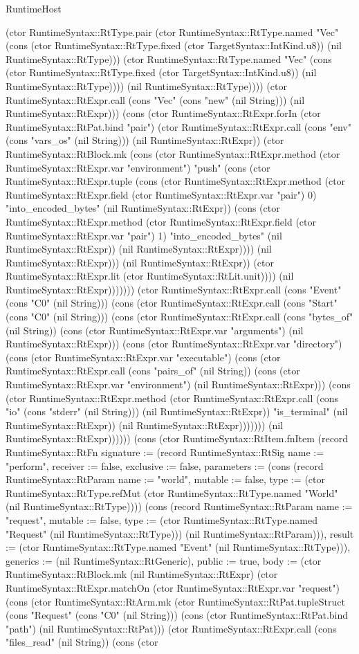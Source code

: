 \begin{lexlean}{RuntimeHost}
\begin{semanticmodule}
{(ctor RuntimeSyntax::RtType.pair (ctor RuntimeSyntax::RtType.named "Vec" (cons (ctor RuntimeSyntax::RtType.fixed (ctor TargetSyntax::IntKind.u8)) (nil RuntimeSyntax::RtType))) (ctor RuntimeSyntax::RtType.named "Vec" (cons (ctor RuntimeSyntax::RtType.fixed (ctor TargetSyntax::IntKind.u8)) (nil RuntimeSyntax::RtType)))) (nil RuntimeSyntax::RtType)))) (ctor RuntimeSyntax::RtExpr.call (cons "Vec" (cons "new" (nil String))) (nil RuntimeSyntax::RtExpr))) (cons (ctor RuntimeSyntax::RtExpr.forIn (ctor RuntimeSyntax::RtPat.bind "pair") (ctor RuntimeSyntax::RtExpr.call (cons "env" (cons "vars_os" (nil String))) (nil RuntimeSyntax::RtExpr)) (ctor RuntimeSyntax::RtBlock.mk (cons (ctor RuntimeSyntax::RtExpr.method (ctor RuntimeSyntax::RtExpr.var "environment") "push" (cons (ctor RuntimeSyntax::RtExpr.tuple (cons (ctor RuntimeSyntax::RtExpr.method (ctor RuntimeSyntax::RtExpr.field (ctor RuntimeSyntax::RtExpr.var "pair") 0) "into_encoded_bytes" (nil RuntimeSyntax::RtExpr)) (cons (ctor RuntimeSyntax::RtExpr.method (ctor RuntimeSyntax::RtExpr.field (ctor RuntimeSyntax::RtExpr.var "pair") 1) "into_encoded_bytes" (nil RuntimeSyntax::RtExpr)) (nil RuntimeSyntax::RtExpr)))) (nil RuntimeSyntax::RtExpr))) (nil RuntimeSyntax::RtExpr)) (ctor RuntimeSyntax::RtExpr.lit (ctor RuntimeSyntax::RtLit.unit)))) (nil RuntimeSyntax::RtExpr))))))) (ctor RuntimeSyntax::RtExpr.call (cons "Event" (cons "C0" (nil String))) (cons (ctor RuntimeSyntax::RtExpr.call (cons "Start" (cons "C0" (nil String))) (cons (ctor RuntimeSyntax::RtExpr.call (cons "bytes_of" (nil String)) (cons (ctor RuntimeSyntax::RtExpr.var "arguments") (nil RuntimeSyntax::RtExpr))) (cons (ctor RuntimeSyntax::RtExpr.var "directory") (cons (ctor RuntimeSyntax::RtExpr.var "executable") (cons (ctor RuntimeSyntax::RtExpr.call (cons "pairs_of" (nil String)) (cons (ctor RuntimeSyntax::RtExpr.var "environment") (nil RuntimeSyntax::RtExpr))) (cons (ctor RuntimeSyntax::RtExpr.method (ctor RuntimeSyntax::RtExpr.call (cons "io" (cons "stderr" (nil String))) (nil RuntimeSyntax::RtExpr)) "is_terminal" (nil RuntimeSyntax::RtExpr)) (nil RuntimeSyntax::RtExpr))))))) (nil RuntimeSyntax::RtExpr))))})) (cons (ctor RuntimeSyntax::RtItem.fnItem (record RuntimeSyntax::RtFn {signature := (record RuntimeSyntax::RtSig {name := "perform", receiver := false, exclusive := false, parameters := (cons (record RuntimeSyntax::RtParam {name := "world", mutable := false, type := (ctor RuntimeSyntax::RtType.refMut (ctor RuntimeSyntax::RtType.named "World" (nil RuntimeSyntax::RtType)))}) (cons (record RuntimeSyntax::RtParam {name := "request", mutable := false, type := (ctor RuntimeSyntax::RtType.named "Request" (nil RuntimeSyntax::RtType))}) (nil RuntimeSyntax::RtParam))), result := (ctor RuntimeSyntax::RtType.named "Event" (nil RuntimeSyntax::RtType))}), generics := (nil RuntimeSyntax::RtGeneric), public := true, body := (ctor RuntimeSyntax::RtBlock.mk (nil RuntimeSyntax::RtExpr) (ctor RuntimeSyntax::RtExpr.matchOn (ctor RuntimeSyntax::RtExpr.var "request") (cons (ctor RuntimeSyntax::RtArm.mk (ctor RuntimeSyntax::RtPat.tupleStruct (cons "Request" (cons "C0" (nil String))) (cons (ctor RuntimeSyntax::RtPat.bind "path") (nil RuntimeSyntax::RtPat))) (ctor RuntimeSyntax::RtExpr.call (cons "files_read" (nil String)) (cons (ctor }
\end{semanticmodule}
\end{lexlean}
